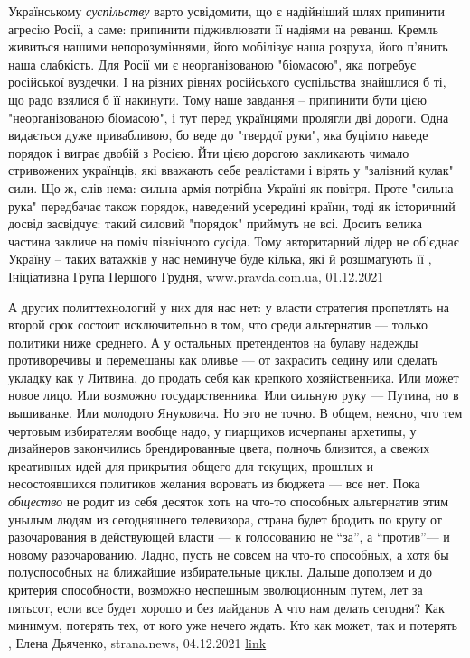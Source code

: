 Українському \emph{суспільству} варто усвідомити, що є надійніший шлях припинити
агресію Росії, а саме: припинити підживлювати її надіями на реванш.  Кремль
живиться нашими непорозуміннями, його мобілізує наша розруха, його п’янить наша
слабкість. Для Росії ми є неорганізованою "біомасою", яка потребує російської
вуздечки. І на різних рівнях російського суспільства знайшлися б ті, що радо
взялися б її накинути.  Тому наше завдання – припинити бути цією
"неорганізованою біомасою", і тут перед українцями пролягли дві дороги.  Одна
видається дуже привабливою, бо веде до "твердої руки", яка буцімто наведе
порядок і виграє двобій з Росією. Йти цією дорогою закликають чимало
стривожених українців, які вважають себе реалістами і вірять у "залізний кулак"
сили. Що ж, слів нема: сильна армія потрібна Україні як повітря. Проте "сильна
рука" передбачає також порядок, наведений усередині країни, тоді як історичний
досвід засвідчує: такий силовий "порядок" приймуть не всі. Досить велика
частина закличе на поміч північного сусіда. Тому авторитарний лідер не об’єднає
Україну – таких ватажків у нас неминуче буде кілька, які й розшматують її
, 
Ініціативна Група Першого Грудня, www.pravda.com.ua, 01.12.2021

А других политтехнологий у них для нас нет: у власти стратегия пропетлять на
второй срок состоит исключительно в том, что среди альтернатив — только
политики ниже среднего. А у остальных претендентов на булаву надежды
противоречивы и перемешаны как оливье — от закрасить седину или сделать укладку
как у Литвина, до продать себя как крепкого хозяйственника. Или может новое
лицо. Или возможно государственника. Или сильную руку — Путина, но в вышиванке.
Или молодого Януковича. Но это не точно. В общем, неясно, что тем чертовым
избирателям вообще надо, у пиарщиков исчерпаны архетипы, у дизайнеров
закончились брендированные цвета, полночь близится, а свежих креативных идей
для прикрытия общего для текущих, прошлых и несостоявшихся политиков желания
воровать из бюджета — все нет.  Пока \emph{общество} не родит из себя десяток
хоть на что-то способных альтернатив этим унылым людям из сегодняшнего
телевизора, страна будет бродить по кругу от разочарования в действующей власти
— к голосованию не \enquote{за}, а \enquote{против}— и новому разочарованию. Ладно, пусть не
совсем на что-то способных, а хотя бы полуспособных на ближайшие избирательные
циклы. Дальше доползем и до критерия способности, возможно неспешным
эволюционным путем, лет за пятьсот, если все будет хорошо и без майданов А что
нам делать сегодня? Как минимум, потерять тех, от кого уже нечего ждать.  Кто
как может, так и потерять
, 
Елена Дьяченко, strana.news, 04.12.2021
\href{https://strana.news/opinions/365443-alternativy-vlasti-takaja-zhe-kromeshnaja-bezyskhodnost-kak-i-ona-sama.html}{link}
